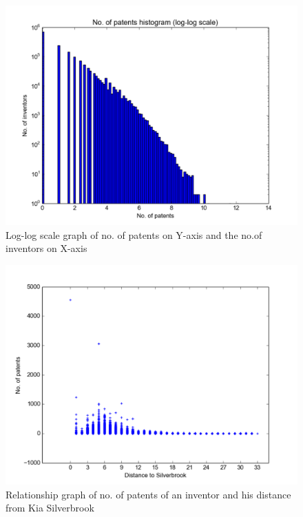 \begin{figure}
  \includegraphics[scale=0.425]{figure/silver_log_log.pdf}
  \caption{\scriptsize Log-log scale graph of no. of patents on Y-axis and the no.of inventors on X-axis}
\label{fig:patent}	
\end{figure}

\begin{figure}
  \includegraphics[scale=0.425]{figure/distance_patents.pdf}
  \caption{\scriptsize Relationship graph of no. of patents of an inventor and his distance from Kia Silverbrook}
\label{fig:distance_patent}
\end{figure}


